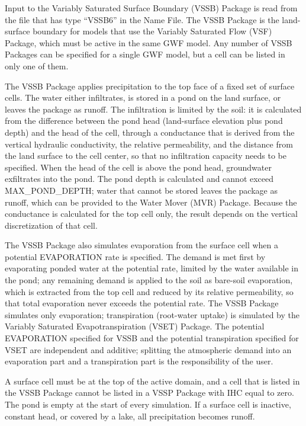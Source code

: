 Input to the Variably Saturated Surface Boundary (VSSB) Package is read from the file that has type ``VSSB6'' in the Name File.  The VSSB Package is the land-surface boundary for models that use the Variably Saturated Flow (VSF) Package, which must be active in the same GWF model.  Any number of VSSB Packages can be specified for a single GWF model, but a cell can be listed in only one of them.

The VSSB Package applies precipitation to the top face of a fixed set of surface cells.  The water either infiltrates, is stored in a pond on the land surface, or leaves the package as runoff.  The infiltration is limited by the soil: it is calculated from the difference between the pond head (land-surface elevation plus pond depth) and the head of the cell, through a conductance that is derived from the vertical hydraulic conductivity, the relative permeability, and the distance from the land surface to the cell center, so that no infiltration capacity needs to be specified.  When the head of the cell is above the pond head, groundwater exfiltrates into the pond.  The pond depth is calculated and cannot exceed MAX\_POND\_DEPTH; water that cannot be stored leaves the package as runoff, which can be provided to the Water Mover (MVR) Package.  Because the conductance is calculated for the top cell only, the result depends on the vertical discretization of that cell.

The VSSB Package also simulates evaporation from the surface cell when a potential EVAPORATION rate is specified.  The demand is met first by evaporating ponded water at the potential rate, limited by the water available in the pond; any remaining demand is applied to the soil as bare-soil evaporation, which is extracted from the top cell and reduced by its relative permeability, so that total evaporation never exceeds the potential rate.  The VSSB Package simulates only evaporation; transpiration (root-water uptake) is simulated by the Variably Saturated Evapotranspiration (VSET) Package.  The potential EVAPORATION specified for VSSB and the potential transpiration specified for VSET are independent and additive; splitting the atmospheric demand into an evaporation part and a transpiration part is the responsibility of the user.

A surface cell must be at the top of the active domain, and a cell that is listed in the VSSB Package cannot be listed in a VSSP Package with IHC equal to zero.  The pond is empty at the start of every simulation.  If a surface cell is inactive, constant head, or covered by a lake, all precipitation becomes runoff.

